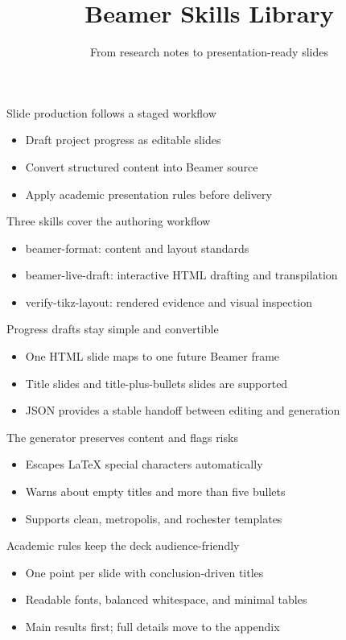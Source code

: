 \documentclass[aspectratio=169,14pt]{beamer}
\title{Beamer Skills Library}
\subtitle{From research notes to presentation-ready slides}
\begin{document}
\begin{frame}[plain]
\titlepage
\end{frame}

\begin{frame}{Slide production follows a staged workflow}
\begin{itemize}
  \item Draft project progress as editable slides
  \item Convert structured content into Beamer source
  \item Apply academic presentation rules before delivery
\end{itemize}
\end{frame}

\begin{frame}{Three skills cover the authoring workflow}
\begin{itemize}
  \item beamer-format: content and layout standards
  \item beamer-live-draft: interactive HTML drafting and transpilation
  \item verify-tikz-layout: rendered evidence and visual inspection
\end{itemize}
\end{frame}

\begin{frame}{Progress drafts stay simple and convertible}
\begin{itemize}
  \item One HTML slide maps to one future Beamer frame
  \item Title slides and title-plus-bullets slides are supported
  \item JSON provides a stable handoff between editing and generation
\end{itemize}
\end{frame}

\begin{frame}{The generator preserves content and flags risks}
\begin{itemize}
  \item Escapes LaTeX special characters automatically
  \item Warns about empty titles and more than five bullets
  \item Supports clean, metropolis, and rochester templates
\end{itemize}
\end{frame}

\begin{frame}{Academic rules keep the deck audience-friendly}
\begin{itemize}
  \item One point per slide with conclusion-driven titles
  \item Readable fonts, balanced whitespace, and minimal tables
  \item Main results first; full details move to the appendix
\end{itemize}
\end{frame}
\end{document}
